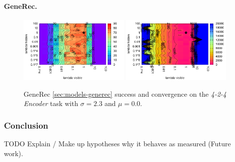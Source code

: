 \paragraph{GeneRec.} 
\begin{figure}[H]
  \centering
  \includegraphics[width=0.48\textwidth]{img/generec-auto4-success.pdf}   
  \includegraphics[width=0.48\textwidth]{img/generec-auto4-epoch.pdf}     
  \caption{GeneRec \ref{sec:models-generec} success and convergence on the \emph{4-2-4 Encoder} task with $\sigma = 2.3$ and $\mu = 0.0$.}
  \label{fig:results-generec-auto4-performance}
\end{figure}


\subsubsection{Conclusion} 
\label{sec:tlr-auto4-conclusion} 

TODO Explain / Make up hypotheses why it behaves as measured (Future work). \\

